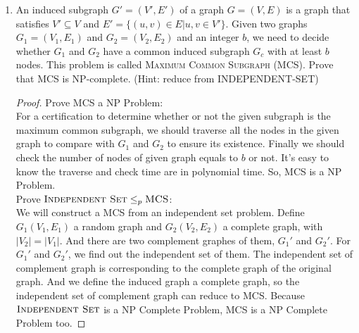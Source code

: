\documentclass[12pt,a4paper]{article}
\theoremstyle{definition}
\begin{document}
\begin{enumerate}
        Given $n$ ingredients to choose from, the $n\times n$ discord matrix and integer $k$ and a number $p$,  decide whether there exists a collection of at least $k$ ingredients that has a penalty $\leqslant p$

    Prove that $\textsc{3-SAT}\leq_p\textsc{Experimental Cuisine}$

    \begin{proof}
        Because $\textsc{3-SAT}\leq_p\textsc{Independent Set}$, so we will prove that $\textsc{Independent Set}\leq_p\textsc{Experimental Cuisine}$. We will construct an independent set to an experimental cuisine. For every two vertices $v_i,v_j$ in graph $G(V,E)$, if $v_i$ and $v_j$ are not connected, the discord number is 0. And if $v_i$ and $v_j$ are connected, the discord number is 1.
        Assign $p=0$, so that we can only choose ingredients with discord number is $0$, which equals to find out the independent set of the original fraph $G$. So, $\textsc{Independent Set}\leq_p\textsc{Experimental Cuisine}$. And because of transitivity, $\textsc{3-SAT}\leq_p\textsc{Experimental Cuisine}$.
    \end{proof} 
    
    \item An induced subgraph $G'=(V',E')$ of a graph $G=(V,E)$ is a graph that satisfies $V'\subseteq V$ and $E' =\{(u,v)\in E| u,v\in V'\}$. Given two graphs $G_1=(V_1,E_1)$ and $G_2=(V_2,E_2)$ and an integer $b$, we need to decide whether $G_1$ and $G_2$ have a common induced subgraph $G_c$ with at least $b$ nodes. This problem is called \textsc{Maximum Common Subgraph} (MCS). Prove that MCS is NP-complete. (Hint: reduce from \textsc{INDEPENDENT-SET})
    
    \begin{proof}
        Prove MCS a NP Problem:\\
        For a certification to determine whether or not the given subgraph is the maximum common subgraph, we should traverse all the nodes in the given graph to compare with $G_1$ and $G_2$ to ensure its existence. Finally we should check the number of nodes of given graph equals to $b$ or not. It's easy to know the traverse and check time are in polynomial time. So, MCS is a NP Problem.\\
        Prove $\textsc{Independent Set}\leq_p\textsc{MCS}$:\\
        We will construct a MCS from an independent set problem. Define $G_1(V_1,E_1)$ a random graph and $G_2(V_2,E_2)$ a complete graph, with $|V_2|=|V_1|$. And there are two complement graphes of them, $G_1'$ and $G_2'$. For $G_1'$ and $G_2'$, we find out the independent set of them. The independent set of complement graph is corresponding to the complete graph of the original graph. And we define the induced graph a complete graph, so the independent set of complement graph can reduce to MCS.
        Because $\textsc{Independent Set}$ is a NP Complete Problem, MCS is a NP Complete Problem too.
    \end{proof}


\end{enumerate}
\end{document}
